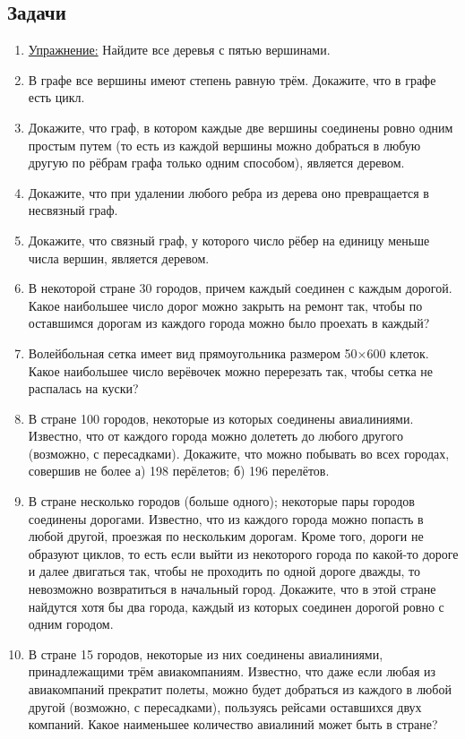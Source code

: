 \documentclass[a4paper,12pt]{article}
\begin{document}
    \subsection*{Задачи}
    \begin{enumerate}
        \item \underline{Упражнение:} Найдите все деревья с пятью вершинами.
        \item В графе все вершины имеют степень равную трём. Докажите, что в графе есть цикл.
        \item Докажите, что граф, в котором каждые две вершины соединены ровно одним простым путем (то есть из каждой вершины можно добраться в любую другую по рёбрам графа только одним способом), является деревом.
        \item Докажите, что при удалении любого ребра из дерева оно превращается в несвязный граф.
        \item Докажите, что связный граф, у которого число рёбер на единицу меньше числа вершин, является деревом.
        \item В некоторой стране 30 городов, причем каждый соединен с каждым дорогой. Какое наибольшее число дорог можно закрыть на ремонт так, чтобы по оставшимся дорогам из каждого города можно было проехать в каждый?
        \item Волейбольная сетка имеет вид прямоугольника размером 50×600 клеток. Какое наибольшее число верёвочек можно перерезать так, чтобы сетка не распалась на куски?
        \item В стране 100 городов, некоторые из которых соединены авиалиниями. Известно, что от каждого города можно долететь до любого другого (возможно, с пересадками). Докажите, что можно побывать во всех городах, совершив не более  а) 198 перёлетов;  б) 196 перелётов.
        \item В стране несколько городов (больше одного); некоторые пары городов соединены дорогами. Известно, что из каждого города можно попасть в любой другой, проезжая по нескольким дорогам. Кроме того, дороги не образуют циклов, то есть если выйти из некоторого города по какой-то дороге и далее двигаться так, чтобы не проходить по одной дороге дважды, то невозможно возвратиться в начальный город. Докажите, что в этой стране найдутся хотя бы два города, каждый из которых соединен дорогой ровно с одним городом.
        \item В стране 15 городов, некоторые из них соединены авиалиниями, принадлежащими трём авиакомпаниям. Известно, что даже если любая из авиакомпаний прекратит полеты, можно будет добраться из каждого в любой другой (возможно, с пересадками), пользуясь рейсами оставшихся двух компаний. Какое наименьшее количество авиалиний может быть в стране?
    \end{enumerate}
\end{document}
